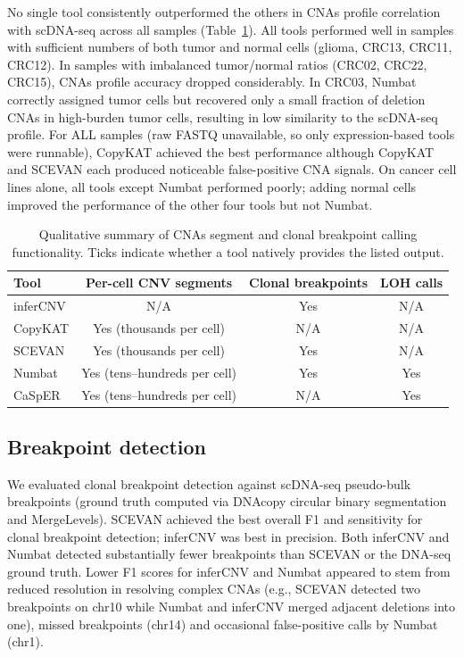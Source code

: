 \documentclass[11pt]{article}
\begin{document}
No single tool consistently outperformed the others in CNAs profile correlation with scDNA-seq across all samples (Table~\ref{tab:cna_summary}). All tools performed well in samples with sufficient numbers of both tumor and normal cells (glioma, CRC13, CRC11, CRC12). In samples with imbalanced tumor/normal ratios (CRC02, CRC22, CRC15), CNAs profile accuracy dropped considerably. In CRC03, Numbat correctly assigned tumor cells but recovered only a small fraction of deletion CNAs in high-burden tumor cells, resulting in low similarity to the scDNA-seq profile. For ALL samples (raw FASTQ unavailable, so only expression-based tools were runnable), CopyKAT achieved the best performance although CopyKAT and SCEVAN each produced noticeable false-positive CNA signals. On cancer cell lines alone, all tools except Numbat performed poorly; adding normal cells improved the performance of the other four tools but not Numbat.

\begin{table}[ht]
\centering
\caption{Qualitative summary of CNAs segment and clonal breakpoint calling functionality. Ticks indicate whether a tool natively provides the listed output.}
\label{tab:cna_summary}
\begin{tabular}{lccc}
\toprule
Tool & Per-cell CNV segments & Clonal breakpoints & LOH calls \\
\midrule
inferCNV & N/A  & Yes & N/A \\
CopyKAT  & Yes (thousands per cell) & N/A & N/A \\
SCEVAN   & Yes (thousands per cell) & Yes & N/A \\
Numbat   & Yes (tens--hundreds per cell) & Yes & Yes \\
CaSpER   & Yes (tens--hundreds per cell) & N/A & Yes \\
\bottomrule
\end{tabular}
\end{table}

\subsection{Breakpoint detection}
We evaluated clonal breakpoint detection against scDNA-seq pseudo-bulk breakpoints (ground truth computed via DNAcopy circular binary segmentation and MergeLevels). SCEVAN achieved the best overall F1 and sensitivity for clonal breakpoint detection; inferCNV was best in precision. Both inferCNV and Numbat detected substantially fewer breakpoints than SCEVAN or the DNA-seq ground truth. Lower F1 scores for inferCNV and Numbat appeared to stem from reduced resolution in resolving complex CNAs (e.g., SCEVAN detected two breakpoints on chr10 while Numbat and inferCNV merged adjacent deletions into one), missed breakpoints (chr14) and occasional false-positive calls by Numbat (chr1).
\end{document}
